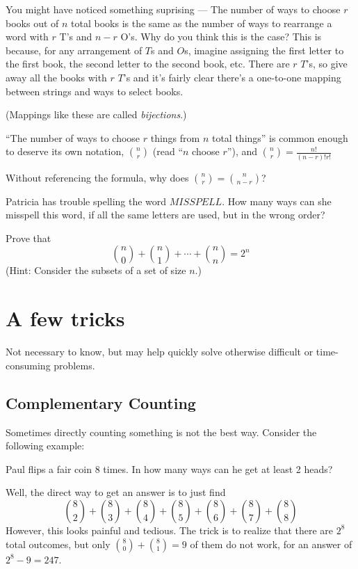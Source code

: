 \documentclass{scrartcl}
\begin{document}
	You might have noticed something suprising --- The number of ways to choose $r$ books out of $n$ total books is the same as the number of ways to rearrange a word with $r$ T's and $n-r$ O's. Why do you think this is the case?
	This is because, for any arrangement of $T$s and $O$s, imagine assigning the first letter to the first book, the second letter to the second book, etc. There are $r$ $T$'s, so give away all the books with $r$ $T$'s and it's fairly clear there's a one-to-one mapping between strings and ways to select books.

	(Mappings like these are called \emph{bijections}.)
	
	``The number of ways to choose $r$ things from $n$ total things'' is common enough to deserve its own notation, $\binom{n}{r}$ (read ``$n$ choose $r$''), and $ \binom{n}{r} = \frac{n!}{(n-r)!r!}$

	\begin{exercise}
		Without referencing the formula, why does $\binom{n}{r} = \binom{n}{n-r}$?
	\end{exercise}
	\begin{exercise}
		Patricia has trouble spelling the word $MISSPELL$. How many ways can she misspell this word, if all the same letters are used, but in the wrong order?
	\end{exercise}
	\begin{exercise}
		Prove that
		\[\binom{n}{0} + \binom{n}{1} + \cdots + \binom{n}{n} = 2^n\]
		(Hint: Consider the subsets of a set of size $n$.)
	\end{exercise}

	\section{A few tricks}
	Not necessary to know, but may help quickly solve otherwise difficult or time-consuming problems.

	\subsection{Complementary Counting}
	Sometimes directly counting something is not the best way. Consider the following example:
	\begin{example}
		Paul flips a fair coin 8 times. In how many ways can he get at least 2 heads?
	\end{example}
	\begin{soln}
Well, the direct way to get an answer is to just find
\[\binom{8}{2}+\binom{8}{3}+\binom{8}{4}+\binom{8}{5}+\binom{8}{6}+\binom{8}{7}+\binom{8}{8}\]
However, this looks painful and tedious. The trick is to realize that there are $2^8$ total outcomes, but only $\binom{8}{0} + \binom{8}{1} = 9$ of them do not work, for an answer of $2^8 - 9 = \boxed{247}$.
	\end{soln}
\end{document}
